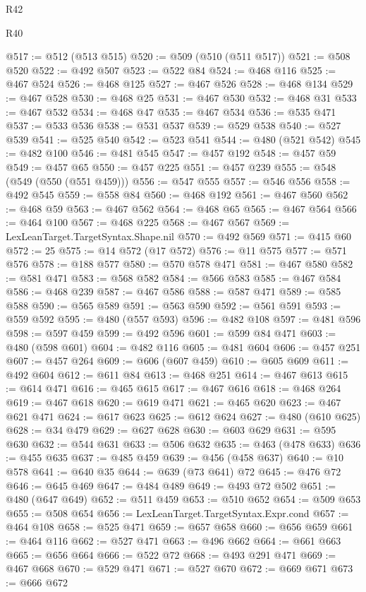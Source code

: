 \begin{lexlean}{R42}
\begin{lexlean}{R40}
\begin{coremodule}
{{{{{{{{{{{{{{{{{{{{{{{{{{{{{{{{{{{{{{{{{{{{{{{{{{{{{{{{{{{{{{{{{{{{{{{{{{{{{{{{{{{{{{{{{{{{{{{{{{{{{{{{{{{{{@517 := @512 (@513 @515)
@520 := @509 (@510 (@511 @517))
@521 := @508 @520
@522 := @492 @507
@523 := @522 @84
@524 := @468 @116
@525 := @467 @524
@526 := @468 @125
@527 := @467 @526
@528 := @468 @134
@529 := @467 @528
@530 := @468 @25
@531 := @467 @530
@532 := @468 @31
@533 := @467 @532
@534 := @468 @47
@535 := @467 @534
@536 := @535 @471
@537 := @533 @536
@538 := @531 @537
@539 := @529 @538
@540 := @527 @539
@541 := @525 @540
@542 := @523 @541
@544 := @480 (@521 @542)
@545 := @482 @100
@546 := @481 @545
@547 := @457 @192
@548 := @457 @59
@549 := @457 @65
@550 := @457 @225
@551 := @457 @239
@555 := @548 (@549 (@550 (@551 @459)))
@556 := @547 @555
@557 := @546 @556
@558 := @492 @545
@559 := @558 @84
@560 := @468 @192
@561 := @467 @560
@562 := @468 @59
@563 := @467 @562
@564 := @468 @65
@565 := @467 @564
@566 := @464 @100
@567 := @468 @225
@568 := @467 @567
@569 := LexLeanTarget.TargetSyntax.Shape.nil
@570 := @492 @569
@571 := @415 @60
@572 := 25
@575 := @14 @572 (@17 @572)
@576 := @11 @575
@577 := @571 @576
@578 := @188 @577
@580 := @570 @578 @471
@581 := @467 @580
@582 := @581 @471
@583 := @568 @582
@584 := @566 @583
@585 := @467 @584
@586 := @468 @239
@587 := @467 @586
@588 := @587 @471
@589 := @585 @588
@590 := @565 @589
@591 := @563 @590
@592 := @561 @591
@593 := @559 @592
@595 := @480 (@557 @593)
@596 := @482 @108
@597 := @481 @596
@598 := @597 @459
@599 := @492 @596
@601 := @599 @84 @471
@603 := @480 (@598 @601)
@604 := @482 @116
@605 := @481 @604
@606 := @457 @251
@607 := @457 @264
@609 := @606 (@607 @459)
@610 := @605 @609
@611 := @492 @604
@612 := @611 @84
@613 := @468 @251
@614 := @467 @613
@615 := @614 @471
@616 := @465 @615
@617 := @467 @616
@618 := @468 @264
@619 := @467 @618
@620 := @619 @471
@621 := @465 @620
@623 := @467 @621 @471
@624 := @617 @623
@625 := @612 @624
@627 := @480 (@610 @625)
@628 := @34 @479
@629 := @627 @628
@630 := @603 @629
@631 := @595 @630
@632 := @544 @631
@633 := @506 @632
@635 := @463 (@478 @633)
@636 := @455 @635
@637 := @485 @459
@639 := @456 (@458 @637)
@640 := @10 @578
@641 := @640 @35
@644 := @639 (@73 @641) @72
@645 := @476 @72
@646 := @645 @469
@647 := @484 @489
@649 := @493 @72 @502
@651 := @480 (@647 @649)
@652 := @511 @459
@653 := @510 @652
@654 := @509 @653
@655 := @508 @654
@656 := LexLeanTarget.TargetSyntax.Expr.cond
@657 := @464 @108
@658 := @525 @471
@659 := @657 @658
@660 := @656 @659
@661 := @464 @116
@662 := @527 @471
@663 := @496 @662
@664 := @661 @663
@665 := @656 @664
@666 := @522 @72
@668 := @493 @291 @471
@669 := @467 @668
@670 := @529 @471
@671 := @527 @670
@672 := @669 @671
@673 := @666 @672
}}}}}}}}}}}}}}}}}}}}}}}}}}}}}}}}}}}}}}}}}}}}}}}}}}}}}}}}}}}}}}}}}}}}}}}}}}}}}}}}}}}}}}}}}}}}}}}}}}}}}}}}}}}}}
\end{coremodule}
\end{lexlean}
\end{lexlean}
